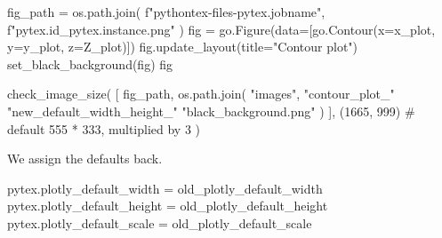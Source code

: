 \documentclass[oneside]{book}
\begin{document}
\begin{pycell}
fig_path = os.path.join(
    f"pythontex-files-{pytex.jobname}",
    f"{pytex.id}_{pytex.instance}.png"
)
fig = go.Figure(data=[go.Contour(x=x_plot, y=y_plot, z=Z_plot)])
fig.update_layout(title="Contour plot")
set_black_background(fig)
fig
\end{pycell}

\begin{pycell}
check_image_size(
    [
        fig_path,
        os.path.join(
            "images",
            "contour_plot_"
            "new_default_width_height_"
            "black_background.png"
        )
    ],
    (1665, 999)  # default 555 * 333, multiplied by 3
)
\end{pycell}

\begin{mdcell}
We assign the defaults back.
\end{mdcell}

\begin{pycell}
pytex.plotly_default_width = old_plotly_default_width
pytex.plotly_default_height = old_plotly_default_height
pytex.plotly_default_scale = old_plotly_default_scale
\end{pycell}
\end{document}
